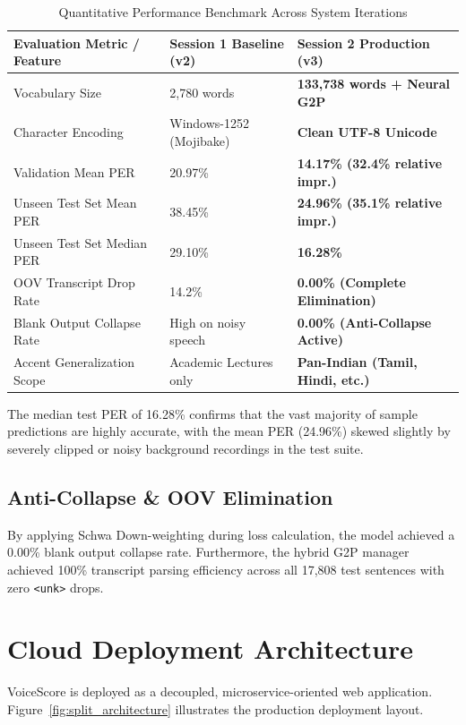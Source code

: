 \documentclass[11pt,a4paper]{article}
\begin{document}
\begin{table}[h]
    \centering
    \caption{Quantitative Performance Benchmark Across System Iterations}\label{tab:model_performance_comparison}
    \vspace{0.5em}
    \begin{tabular}{p{4.5cm} p{4.2cm} p{5.0cm}}
        \toprule
        \textbf{Evaluation Metric / Feature} & \textbf{Session 1 Baseline (v2)} & \textbf{Session 2 Production (v3)} \\
        \midrule
        Vocabulary Size & 2,780 words & \textbf{133,738 words + Neural G2P} \\
        Character Encoding & Windows-1252 (Mojibake) & \textbf{Clean UTF-8 Unicode} \\
        Validation Mean PER & 20.97\% & \textbf{14.17\% (32.4\% relative impr.)} \\
        Unseen Test Set Mean PER & 38.45\% & \textbf{24.96\% (35.1\% relative impr.)} \\
        Unseen Test Set Median PER & 29.10\% & \textbf{16.28\%} \\
        OOV Transcript Drop Rate & 14.2\% & \textbf{0.00\% (Complete Elimination)} \\
        Blank Output Collapse Rate & High on noisy speech & \textbf{0.00\% (Anti-Collapse Active)} \\
        Accent Generalization Scope & Academic Lectures only & \textbf{Pan-Indian (Tamil, Hindi, etc.)} \\
        \bottomrule
    \end{tabular}
\end{table}

The median test PER of 16.28\% confirms that the vast majority of sample predictions are highly accurate, with the mean PER (24.96\%) skewed slightly by severely clipped or noisy background recordings in the test suite.

\subsection{Anti-Collapse \& OOV Elimination}
By applying Schwa Down-weighting during loss calculation, the model achieved a 0.00\% blank output collapse rate. Furthermore, the hybrid G2P manager achieved 100\% transcript parsing efficiency across all 17,808 test sentences with zero \texttt{<unk>} drops.

\section{Cloud Deployment Architecture}\label{sec7}
VoiceScore is deployed as a decoupled, microservice-oriented web application. Figure~\ref{fig:split_architecture} illustrates the production deployment layout.
\end{document}
